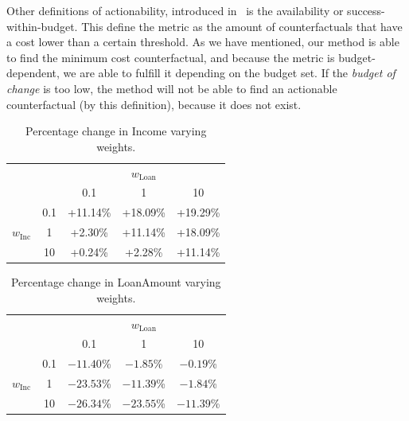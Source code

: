 \documentclass[12pt]{extarticle}
\numberwithin{equation}{section}
\begin{document}
Other definitions of actionability, introduced in~\cite{ustun2019actionable} is the availability or success-within-budget. This define the metric as the amount of counterfactuals that have a cost lower than a certain threshold. As we have mentioned, our method is able to find the minimum cost counterfactual, and because the metric is budget-dependent, we are able to fulfill it depending on the budget set. If the \emph{budget of change} is too low, the method will not be able to find an actionable counterfactual (by this definition), because it does not exist.

\begin{table}[ht]
    \centering
    \begin{tabular}{cc|ccc}
             &                 & \multicolumn{3}{c}{$w_{\text{Loan}}$} \\
     & & 0.1 & 1 & 10 \\
     \cmidrule(l){1-5}
    \multirow{3}{*}{$w_{\text{Inc}}$}
             & 0.1 & +11.14\% & +18.09\% & +19.29\% \\
             & 1   &  +2.30\% & +11.14\% & +18.09\% \\
             & 10  &  +0.24\% &  +2.28\% & +11.14\% \\
    \bottomrule
\end{tabular}

    \caption{Percentage change in Income varying weights.}
    \label{tab:delta_income}
\end{table}
    
\begin{table}[ht]
    \centering
    \begin{tabular}{cc|ccc}
             &                 & \multicolumn{3}{c}{$w_{\text{Loan}}$} \\
     & & 0.1 & 1 & 10 \\
     \cmidrule(l){1-5}
    \multirow{3}{*}{$w_{\text{Inc}}$}
            & 0.1 & $-11.40$\% &  $-1.85$\% &  $-0.19$\% \\
            & 1   & $-23.53$\% & $-11.39$\% &  $-1.84$\% \\
            & 10  & $-26.34$\% & $-23.55$\% & $-11.39$\% \\
    \bottomrule
\end{tabular}

    \caption{Percentage change in LoanAmount varying weights.}
    \label{tab:delta_loan}
\end{table}
\end{document}
